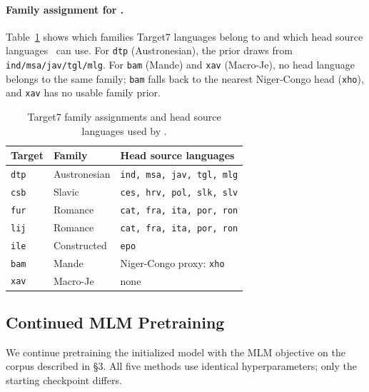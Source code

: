 \paragraph{Family assignment for \famm.}
Table~\ref{tab:fam} shows which families Target7 languages belong to and which head
source languages \famm\ can use.
For \texttt{dtp} (Austronesian), the prior draws from \texttt{ind/msa/jav/tgl/mlg}.
For \texttt{bam} (Mande) and \texttt{xav} (Macro-Je), no head language belongs to the
same family; \texttt{bam} falls back to the nearest Niger-Congo head (\texttt{xho}),
and \texttt{xav} has no usable family prior.

\begin{table}[h]\centering\small
\caption{Target7 family assignments and head source languages used by \famm.}
\label{tab:fam}
\begin{tabular}{@{}lll@{}}
\toprule
Target & Family & Head source languages \\
\midrule
\texttt{dtp} & Austronesian & \texttt{ind, msa, jav, tgl, mlg} \\
\texttt{csb} & Slavic & \texttt{ces, hrv, pol, slk, slv} \\
\texttt{fur} & Romance & \texttt{cat, fra, ita, por, ron} \\
\texttt{lij} & Romance & \texttt{cat, fra, ita, por, ron} \\
\texttt{ile} & Constructed & \texttt{epo} \\
\texttt{bam} & Mande & Niger-Congo proxy: \texttt{xho} \\
\texttt{xav} & Macro-Je & none \\
\bottomrule
\end{tabular}
\end{table}

\subsection{Continued MLM Pretraining}

We continue pretraining the initialized model with the MLM objective on the corpus
described in \S3.
All five methods use identical hyperparameters; only the starting checkpoint differs.

